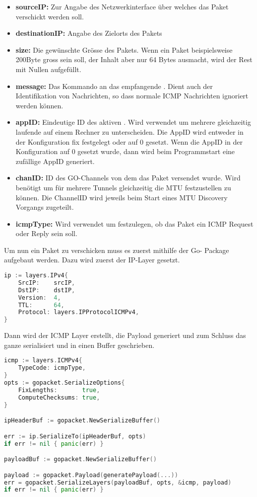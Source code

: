 \begin{itemize}
\item \textbf{sourceIP:} Zur Angabe des Netzwerkinterface über welches das Paket verschickt werden soll.
\item \textbf{destinationIP:} Angabe des Zielorts des Pakets
\item \textbf{size:} Die gewünschte Grösse des Pakets. Wenn ein Paket beispielsweise 200Byte gross sein soll, der Inhalt aber nur 64 Bytes ausmacht, wird der Rest mit Nullen aufgefüllt.
\item \textbf{message:} Das Kommando an das empfangende \tool{}. Dient auch der Identifikation von Nachrichten, so dass normale \ac{ICMP} Nachrichten ignoriert werden können.
\item \textbf{appID:} Eindeutige ID des aktiven \tool{}. Wird verwendet um mehrere gleichzeitig laufende \tool{} auf einem Rechner zu unterscheiden. Die AppID wird entweder in der Konfiguration fix festgelegt oder auf 0 gesetzt. Wenn die AppID in der Konfiguration auf 0 gesetzt wurde, dann wird beim Programmstart eine zufällige AppID generiert.
\item \textbf{chanID:} ID des GO-Channels von dem das Paket versendet wurde. Wird benötigt um für mehrere Tunnels gleichzeitig die \acs{MTU} festzustellen zu können. Die ChannelID wird jeweils beim Start eines \acs{MTU} Discovery Vorgangs zugeteilt.
\item \textbf{icmpType:} Wird verwendet um festzulegen, ob das Paket ein \ac{ICMP} Request oder Reply sein soll. 
\end{itemize}

Um nun ein Paket zu verschicken muss es zuerst mithilfe der Go-  Package aufgebaut werden. Dazu wird zuerst der IP-Layer gesetzt.

\begin{lstlisting}[language=go, caption=IP Layer aufbauen]  
ip := layers.IPv4{
	SrcIP:    srcIP,
	DstIP:    dstIP,
	Version:  4,
	TTL:      64,
	Protocol: layers.IPProtocolICMPv4,
}
\end{lstlisting}

Dann wird der ICMP Layer erstellt, die Payload generiert und zum Schluss das ganze serialisiert und in einen Buffer geschrieben.

\begin{lstlisting}[language=go, caption=ICMP Layer aufbauen]  
icmp := layers.ICMPv4{
	TypeCode: icmpType,
}
opts := gopacket.SerializeOptions{
	FixLengths:       true,
	ComputeChecksums: true,
}

ipHeaderBuf := gopacket.NewSerializeBuffer()

err := ip.SerializeTo(ipHeaderBuf, opts)
if err != nil { panic(err) }

payloadBuf := gopacket.NewSerializeBuffer()

payload := gopacket.Payload(generatePayload(...))
err = gopacket.SerializeLayers(payloadBuf, opts, &icmp, payload)
if err != nil { panic(err) }
\end{lstlisting}


